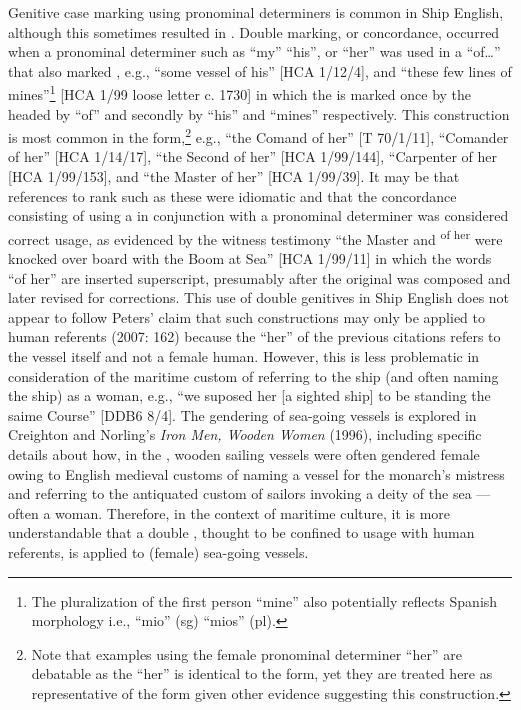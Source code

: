 Genitive case marking using  pronominal determiners is common in Ship English, although this sometimes resulted in . Double  marking, or  concordance, occurred when a pronominal  determiner such as “my” “his”, or “her” was used in a  “of…” that also marked , e.g., “some vessel of his” [HCA 1/12/4], and “these few lines of mines”\footnote{The pluralization of the first person   “mine” also potentially reflects Spanish morphology i.e., “mio” (sg) “mios” (pl).} [HCA 1/99 loose letter c. 1730] in which the  is marked once by the  headed by “of” and secondly by “his” and “mines” respectively. This construction is most common in the  form,\footnote{Note that examples using the female   pronominal determiner “her” are debatable as the  “her” is identical to the  form, yet they are treated here as representative of the  form given other evidence suggesting this construction.} e.g., “the Comand of her” [T 70/1/11], “Comander of her” [HCA 1/14/17], “the Second  of her” [HCA 1/99/144], “Carpenter of her [HCA 1/99/153], and “the Master of her” [HCA 1/99/39]. It may be that references to rank such as these were idiomatic and that the  concordance consisting of using a  in conjunction with a  pronominal determiner was considered correct usage, as evidenced by the witness testimony “the Master and  \textsuperscript{of her} were knocked over board with the Boom at Sea” [HCA 1/99/11] in which the words “of her” are inserted superscript, presumably after the original was composed and later revised for corrections.  This use of double genitives in Ship English does not appear to follow Peters’ claim that such constructions may only be applied to human referents (2007: 162) because the “her” of the previous citations refers to the vessel itself and not a female human. However, this is less problematic in consideration of the maritime custom of referring to the ship (and often naming the ship) as a woman, e.g., “we suposed her [a sighted ship] to be standing the saime Course” [DDB6 8/4]. The gendering of sea-going vessels is explored in Creighton and Norling’s \textit{Iron Men, Wooden Women} (1996), including specific details about how, in the , wooden sailing vessels were often gendered female owing to English medieval customs of naming a vessel for the monarch’s mistress and referring to the antiquated custom of sailors invoking a deity of the sea — often a woman. Therefore, in the context of maritime culture, it is more understandable that a double , thought to be confined to usage with human referents, is applied to (female) sea-going vessels. 

